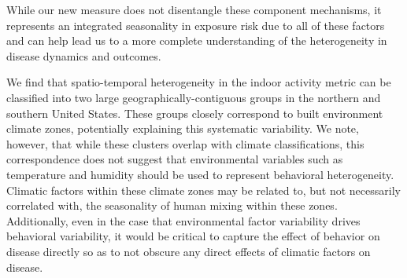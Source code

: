 \documentclass{article}
\begin{document}
While our new measure does not disentangle these component mechanisms, it represents an integrated seasonality in exposure risk due to all of these factors and can help lead us to a more complete understanding of the heterogeneity in disease dynamics and outcomes.

We find that spatio-temporal heterogeneity in the indoor activity metric can be classified into two large geographically-contiguous groups in the northern and southern United States. These groups closely correspond to built environment climate zones, potentially explaining this systematic variability. We note, however, that while these clusters overlap with climate classifications, this correspondence does not suggest that environmental variables such as temperature and humidity should be used to represent behavioral heterogeneity. Climatic factors within these climate zones may be related to, but not necessarily correlated with, the seasonality of human mixing within these zones. Additionally, even in the case that environmental factor variability drives behavioral variability, it would be critical to capture the effect of behavior on disease directly so as to not obscure any direct effects of climatic factors on disease.
\end{document}
